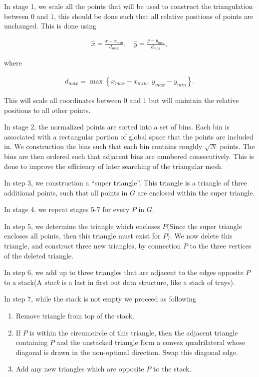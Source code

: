 \documentclass[../fem.tex]{subfiles}
\begin{document}
In stage 1, we scale all the points that will be used to construct the
triangulation between $0$ and $1$, this should be done such that all relative
positions of points are unchanged. This is done using

\begin{align*}
  \hat{x}=\frac{x-x_{min}}{d_{max}},\quad\hat{y}=\frac{y-y_{min}}{d_{max}},
\end{align*}

where

\begin{align*}
  d_{max}=\max\left\{x_{max}-x_{min},\ y_{max}-y_{min}\right\}.
\end{align*}

This will scale all coordinates between $0$ and $1$ but will maintain the
relative positions to all other points.

In stage 2, the normalized points are sorted into a set of bins. Each bin is
associated with a rectangular portion of global space that the points are
included in. We construction the bins such that each bin contains roughly
$\sqrt{N}$ points. The bins are then ordered such that adjacent bins are
numbered consecutively. This is done to improve the efficiency of later
searching of the triangular mesh.

In step 3, we construction a ``super triangle''. This triangle is a triangle of
three additional points, such that all points in $G$ are enclosed within the
super triangle.

In stage 4, we repeat stages 5-7 for every $P$ in $G$.

In step 5, we determine the triangle which encloses $P$(Since the super
triangle encloses all points, then this triangle must exist for $P$). We now
delete this triangle, and construct three new triangles, by connection $P$ to
the three vertices of the deleted triangle.

In step 6, we add up to three triangles that are adjacent to the edges opposite
$P$ to a stack(A \textit{stack} is a last in first out data structure, like a
stack of trays).

In step 7, while the stack is not empty we proceed as following

\begin{enumerate}[label=7.\arabic*.]
  \item Remove triangle from top of the stack.
  \item If $P$ is within the circumcircle of this triangle, then the adjacent
    triangle containing $P$ and the unstacked triangle form a convex
    quadrilateral whose diagonal is drawn in the non-optimal direction. Swap
    this diagonal edge.
  \item Add any new triangles which are opposite $P$ to the stack.
\end{enumerate}
\end{document}

